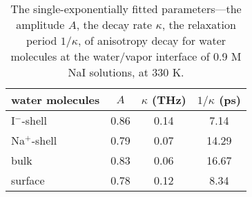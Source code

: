\begin{table}[H]
\centering
\caption{\label{tab:c2_single-exp-fitting_NaI}%
	The single-exponentially fitted parameters---the amplitude $A$, the decay rate $\kappa$, the relaxation period $1/\kappa$, of anisotropy decay for water molecules 
	at the water/vapor interface of 0.9 M NaI solutions, at 330 K.} 
\begin{tabular}{lccc}
	water molecules &  $A$ & $\kappa$ (THz) & $1/\kappa$ (ps)  \\
\hline
	I$^-$-shell  & 0.86  & 0.14  & 7.14 \\
	Na$^+$-shell & 0.79 & 0.07  & 14.29 \\
	bulk & 0.83 & 0.06  & 16.67 \\
	surface & 0.78 & 0.12 & 8.34 \\
\end{tabular}
\end{table}
